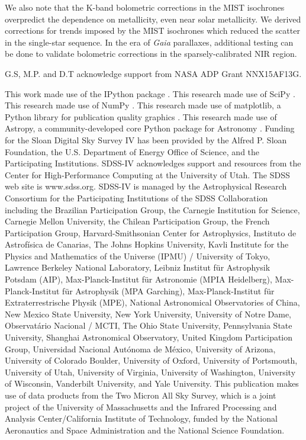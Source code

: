 \documentclass[manuscript]{aastex6}
\newcommand{\Gaia}{\mbox{\textit{Gaia}}}
\begin{document}
We also note that the K-band bolometric corrections in the MIST isochrones
overpredict the dependence on metallicity, even near solar metallicity. We
derived corrections for trends imposed by the MIST isochrones which reduced the
scatter in the single-star sequence. In the era of \Gaia{} parallaxes,
additional testing can be done to validate bolometric corrections in the
sparsely-calibrated NIR region.

\acknowledgments

G.S, M.P. and D.T acknowledge support from NASA ADP Grant NNX15AF13G. 

This work made use of the IPython package \citep{PER-GRA:2007}. This research
made use of SciPy \citep{jones_scipy_2001}. This research made use of NumPy
\citep{van2011numpy}. This research made use of matplotlib, a Python library for
publication quality graphics \citep{Hunter:2007}. This research made use of
Astropy, a community-developed core Python package for Astronomy
\citep{astropy}.
Funding for the Sloan Digital Sky Survey IV has been provided by the Alfred P.
Sloan Foundation, the U.S. Department of Energy Office of Science, and the
Participating Institutions. SDSS-IV acknowledges support and resources from the
Center for High-Performance Computing at the University of Utah. The SDSS web
site is www.sdss.org. SDSS-IV is managed by the Astrophysical Research
Consortium for the Participating Institutions of the SDSS Collaboration
including the Brazilian Participation Group, the Carnegie Institution for
Science, Carnegie Mellon University, the Chilean Participation Group, the
French Participation Group, Harvard-Smithsonian Center for Astrophysics,
Instituto de Astrof\'isica de Canarias, The Johns Hopkins University, Kavli
Institute for the Physics and Mathematics of the Universe (IPMU) / University
of Tokyo, Lawrence Berkeley National Laboratory, Leibniz Institut f\"ur
Astrophysik Potsdam (AIP), Max-Planck-Institut f\"ur Astronomie (MPIA
Heidelberg), Max-Planck-Institut f\"ur Astrophysik (MPA Garching),
Max-Planck-Institut f\"ur Extraterrestrische Physik (MPE), National
Astronomical Observatories of China, New Mexico State University, New York
University, University of Notre Dame, Observat\'ario Nacional / MCTI, The Ohio
State University, Pennsylvania State University, Shanghai Astronomical
Observatory, United Kingdom Participation Group, Universidad Nacional
Aut\'onoma de M\'exico, University of Arizona, University of Colorado Boulder,
University of Oxford, University of Portsmouth, University of Utah, University
of Virginia, University of Washington, University of Wisconsin, Vanderbilt
University, and Yale University.  This publication makes use of data products
from the Two Micron All Sky Survey, which is a joint project of the University
of Massachusetts and the Infrared Processing and Analysis Center/California
Institute of Technology, funded by the National Aeronautics and Space
Administration and the National Science Foundation. 



\end{document}
